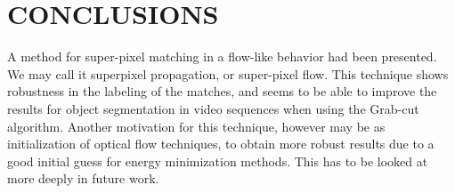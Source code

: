 \documentclass[a4paper, 10pt, conference]{ieeeconf}      %
\begin{document}
\section{CONCLUSIONS}

A method for super-pixel matching in a flow-like
behavior had been presented. We may call it superpixel propagation, or super-pixel flow. This
technique shows robustness in the labeling of the
matches, and seems to be able to improve the results
for object segmentation in video sequences when
using the Grab-cut algorithm. Another motivation for
this technique, however may be as initialization of
optical flow techniques, to obtain more robust results
due to a good initial guess for energy minimization
methods. This has to be looked at more deeply in future work.


\end{document}
